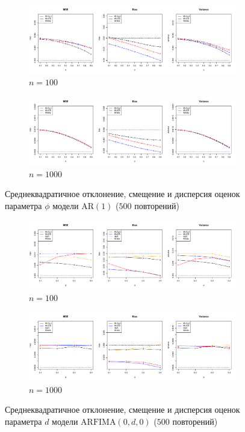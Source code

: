 \documentclass[specialist,
substylefile = spbu_report.rtx,
subf,href,colorlinks=true, 12pt]{disser}
\theoremstyle{definition}
\begin{document}
\begin{figure}[h!]
	\centering
	\begin{subfigure}{\textwidth}
		\includegraphics[width=\textwidth]{img/ar1_est_N100.pdf}
		\caption{$n=100$}
	\end{subfigure}
	\begin{subfigure}{\textwidth}
		\includegraphics[width=\textwidth]{img/ar1_est_N1000.pdf}
		\caption{$n=1000$}
	\end{subfigure}
	\caption{Среднеквадратичное отклонение, смещение и дисперсия оценок параметра $\phi$ модели $\mathrm{AR}(1)$ ($500$ повторений)}
	\label{tab:ar1_est}
\end{figure}
\begin{figure}[h!]
	\centering
	\begin{subfigure}{\textwidth}
		\includegraphics[width=\textwidth]{img/fi_est_N100.pdf}
		\caption{$n=100$}
	\end{subfigure}
	\begin{subfigure}{\textwidth}
		\includegraphics[width=\textwidth]{img/fi_est_N1000.pdf}
		\caption{$n=1000$}
	\end{subfigure}
	\caption{Среднеквадратичное отклонение, смещение и дисперсия оценок параметра $d$ модели $\mathrm{ARFIMA}(0, d, 0)$ ($500$ повторений)}
	\label{tab:fi_est}
\end{figure}
\end{document}
